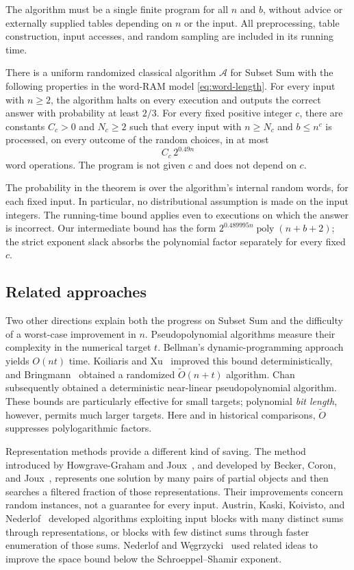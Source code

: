 The algorithm must be a single finite program for all $n$ and $b$,
without advice or externally supplied tables depending on $n$ or the
input.  All preprocessing, table construction, input accesses, and
random sampling are included in its running time.

\begin{theorem}\label{thm:main}
There is a uniform randomized classical algorithm $\mathcal A$ for
Subset Sum with the following properties in the word-RAM model
\eqref{eq:word-length}.
For every input with $n\ge2$, the algorithm halts on every execution
and outputs the correct answer with probability at least $2/3$.
For every fixed positive integer $c$, there are constants $C_c>0$
and $N_c\ge2$ such that every input with $n\ge N_c$ and $b\le n^c$
is processed, on every outcome of the random choices, in at most
\[
                         C_c\,2^{0.49n}
\]
word operations.  The program is not given $c$ and does not depend
on $c$.
\end{theorem}

The probability in the theorem is over the algorithm's internal
random words, for each fixed input.  In particular, no distributional
assumption is made on the input integers.  The running-time bound
applies even to executions on which the answer is incorrect.
Our intermediate bound has the form
$2^{0.489995n}\operatorname{poly}(n+b+2)$; the strict exponent slack
absorbs the polynomial factor separately for every fixed $c$.

\subsection{Related approaches}

Two other directions explain both the progress on Subset Sum and the
difficulty of a worst-case improvement in $n$.  Pseudopolynomial
algorithms measure their complexity in the numerical target $t$.
Bellman's dynamic-programming approach~\cite{Bellman1957} yields
$O(nt)$ time.  Koiliaris and Xu~\cite{KoiliarisXu2017} improved this
bound deterministically, and Bringmann~\cite{Bringmann2017} obtained
a randomized $\widetilde O(n+t)$ algorithm.  Chan~\cite{Chan2026}
subsequently obtained a deterministic near-linear pseudopolynomial
algorithm.  These bounds are particularly effective for small targets;
polynomial \emph{bit length}, however, permits much larger targets.
Here and in historical comparisons, $\widetilde O$ suppresses
polylogarithmic factors.

Representation methods provide a different kind of saving.  The
method introduced by Howgrave-Graham and Joux~\cite{HGJ2010}, and
developed by Becker, Coron, and Joux~\cite{BCJ2011}, represents one
solution by many pairs of partial objects and then searches a filtered
fraction of those representations.  Their improvements concern
random instances, not a guarantee for every input.  Austrin, Kaski,
Koivisto, and Nederlof~\cite{AKKN2016} developed algorithms exploiting
input blocks with many distinct sums through representations, or
blocks with few distinct sums through faster enumeration of those
sums.  Nederlof and
W\k{e}grzycki~\cite{NederlofWegrzycki2021} used related ideas to improve
the space bound below the Schroeppel--Shamir exponent.

